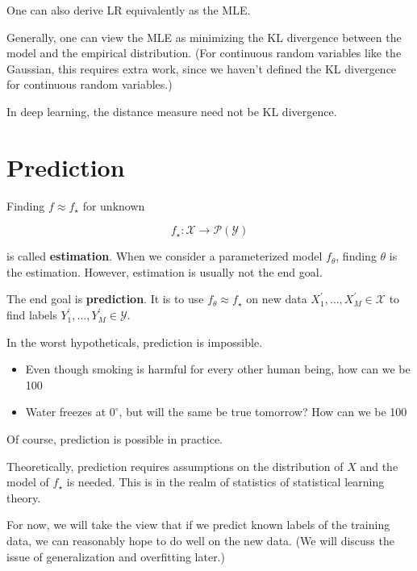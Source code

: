 \begin{concept}
    One can also derive LR equivalently as the MLE.

    Generally, one can view the MLE as minimizing the KL divergence between the model and the empirical distribution. (For continuous random variables like the Gaussian, this requires extra work, since we haven't defined the KL divergence for continuous random variables.)

    In deep learning, the distance measure need not be KL divergence.
\end{concept}

\section{Prediction}

\begin{definition}
    Finding $f \approx f_{\star}$ for unknown

    $$
    f_{\star}: \mathcal{X} \rightarrow \mathcal{P}(\mathcal{Y})
    $$

    is called \textbf{estimation}. When we consider a parameterized model $f_{\theta}$, finding $\theta$ is the estimation. However, estimation is usually not the end goal.

    The end goal is \textbf{prediction}. It is to use $f_{\theta} \approx f_{\star}$ on new data $X_{1}^{\prime}, \ldots, X_{M}^{\prime} \in \mathcal{X}$ to find labels $Y_{1}^{\prime}, \ldots, Y_{M}^{\prime} \in \mathcal{Y}$.
\end{definition}

\begin{concept}
    In the worst hypotheticals, prediction is impossible.

    \begin{itemize}
        \item Even though smoking is harmful for every other human being, how can we be 100%
        \item Water freezes at $0^{\circ}$, but will the same be true tomorrow? How can we be 100%
    \end{itemize}

    Of course, prediction is possible in practice.

    Theoretically, prediction requires assumptions on the distribution of $X$ and the model of $f_{\star}$ is needed. This is in the realm of statistics of statistical learning theory.

    For now, we will take the view that if we predict known labels of the training data, we can reasonably hope to do well on the new data. (We will discuss the issue of generalization and overfitting later.)
\end{concept}

